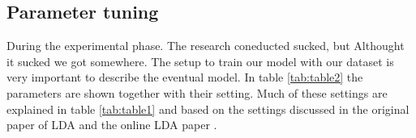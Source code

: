 \subsection{Parameter tuning}\label{methodology:parameter tuning}
During the experimental phase. The research coneducted sucked, but Althought it sucked we got somewhere. 
The setup to train our model with our dataset is very important to describe the eventual model. In table \ref{tab:table2} the parameters are shown together with their setting. Much of these settings are explained in table \ref{tab:table1} and based on the settings discussed in the original paper of LDA \cite{Blei2003} and the online LDA paper \cite{Hoffman2010OnlineAllocation}. 
